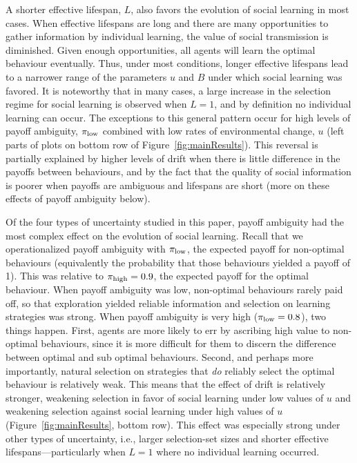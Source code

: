 \documentclass[letterpaper,11.5pt]{scrartcl}
\newcommand{\cm}[1]{{\textcolor{mypurple} {({\tiny CM:} #1)}}}
\begin{document}
A shorter effective lifespan, $L$, also favors the evolution of social learning in most cases. When effective lifespans are long and there are many opportunities to gather information by individual learning, the value of social transmission is diminished. Given enough opportunities, all agents will learn the optimal behaviour eventually. Thus, under most conditions, longer effective lifespans lead to a narrower range of the parameters $u$ and $B$ under which social learning was favored. It is noteworthy that in many cases, a large increase in the selection regime for social learning is observed when $L=1$, and by definition no individual learning can occur. The exceptions to this general pattern occur for high levels of payoff ambiguity, $\pi_{\mathrm{low}}$ combined with low rates of environmental change, $u$ (left parts of plots on bottom row of Figure~\ref{fig:mainResults}). This reversal is partially explained by higher levels of drift when there is little difference in the payoffs between behaviours, and by the fact that the quality of social information is poorer when payoffs are ambiguous and lifespans are short (more on these effects of payoff ambiguity below).  

Of the four types of uncertainty studied in this paper, payoff ambiguity had the most
complex effect on the evolution of social learning. Recall that we operationalized
payoff ambiguity with $\pi_{\mathrm{low}}$, the expected payoff for non-optimal behaviours
(equivalently the probability that those behaviours yielded a payoff of 1). This was
relative to $\pi_{\mathrm{high}} = 0.9$, the expected payoff for the optimal behaviour. When
payoff ambiguity was low, non-optimal behaviours rarely paid off, so that exploration
yielded reliable information and selection on learning strategies was strong. When
payoff ambiguity is very high ($\pi_{\mathrm{low}} = 0.8$), two things happen. First, agents are
more likely to err by ascribing high value to non-optimal behaviours, since it is
more difficult for them to discern the difference between optimal and sub optimal
behaviours. Second, and perhaps more importantly, natural selection on strategies
that \emph{do} reliably select the optimal behaviour is relatively weak. This means that the effect of drift is relatively stronger, weakening selection in favor of social learning under low values of $u$ and weakening selection against social learning under high values of $u$ (Figure~\ref{fig:mainResults}, bottom row). 
This effect was especially strong under other types of uncertainty, i.e., larger selection-set sizes and shorter effective lifespans---particularly when $L=1$ where no individual learning occurred. 
\end{document}

